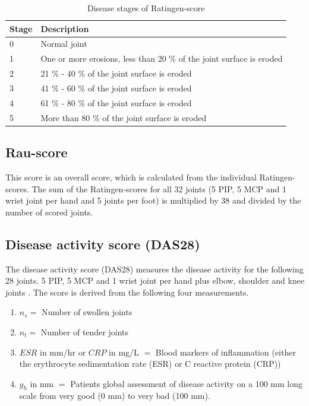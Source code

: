 \documentclass[12pt]{article}
\begin{document}
\begin{table}[ht]
\centering
\caption{Disease stages of Ratingen-score \cite{rau_2007} }
\label{tab:ratingen}
\begin{tabular}{@{}ll@{}}
\toprule
Stage & Description                                                          \\ \midrule
0     & Normal joint                                                         \\
1     & One or more erosions, less than 20 \% of the joint surface is eroded \\
2     & 21 \% - 40 \% of the joint surface is eroded                         \\
3     & 41 \% - 60 \% of the joint surface is eroded                         \\
4     & 61 \% - 80 \% of the joint surface is eroded                         \\
5     & More than 80 \% of the joint surface is eroded                       \\ \bottomrule
\end{tabular}
\end{table}

\subsection{Rau-score}
\label{subsec:rau}

This score is an overall score, which is calculated from the individual Ratingen-scores. The sum of the Ratingen-scores for all 32 joints (5 PIP, 5 MCP and 1 wrist joint per hand and 5 joints per foot) is multiplied by 38 and divided by the number of scored joints.

\subsection{Disease activity score (DAS28)}
\label{subsec:das}

The disease activity score (DAS28) measures the disease activity for the following 28 joints. 5 PIP, 5 MCP and 1 wrist joint per hand plus elbow, shoulder and knee joints \cite{runmc}. The score is derived from the following four measurements.

\begin{enumerate}[label=(\alph*)]
\item $n_s =$ Number of swollen joints
\item $n_t =$ Number of tender joints
\item $ESR$ in mm/hr or $CRP$ in mg/L $=$ Blood markers of inflammation (either the erythrocyte sedimentation rate (ESR) or C reactive protein (CRP))
\item $g_h$ in mm $=$ Patients global assessment of disease activity on a 100 mm long scale from very good (0 mm) to very bad (100 mm).
\end{enumerate}
\end{document}
